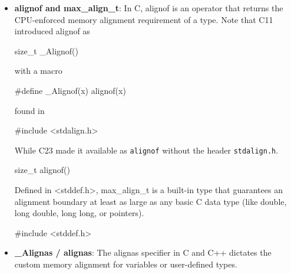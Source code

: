 \documentclass{report}
\begin{document}
\begin{itemize}
\begin{verbatim}
                    +--------+-------------+
                    | header | 208 bytes   |
                    +--------+-------------+
                \end{verbatim}
                If we call the size after the header the \textbf{payload}, then total block size is header plus payload.
                \bigbreak \noindent 
                \begin{cppcode}
                sizeof(block_t) + block->size
                \end{cppcode}
            \item \textbf{alignof and max\_align\_t}: In C, alignof is an operator that returns the CPU-enforced memory alignment requirement of a type. 
                \bigbreak \noindent 
                Note that C11 introduced alignof as
                \bigbreak \noindent 
                \begin{cppcode}
                size_t _Alignof()
                \end{cppcode}
                \bigbreak \noindent 
                with a macro
                \bigbreak \noindent 
                \begin{cppcode}
                #define _Alignof(x) alignof(x)
                \end{cppcode}
                \bigbreak \noindent 
                found in 
                \bigbreak \noindent 
                \begin{cppcode}
                #include <stdalign.h>
                \end{cppcode}
                \bigbreak \noindent 
                While C23 made it available as \texttt{alignof} without the header \texttt{stdalign.h}.
                \bigbreak \noindent 
                \begin{cppcode}
                size_t alignof()
                \end{cppcode}
                \bigbreak \noindent 
                Defined in <stddef.h>, max\_align\_t is a built-in type that guarantees an alignment boundary at least as large as any basic C data type (like double, long double, long long, or pointers).
                \bigbreak \noindent 
                \begin{cppcode}
                #include <stddef.h>
                \end{cppcode}
            \item \textbf{\_Alignas / alignas}: The alignas specifier in C and C++ dictates the custom memory alignment for variables or user-defined types.

\end{itemize}
\end{document}
